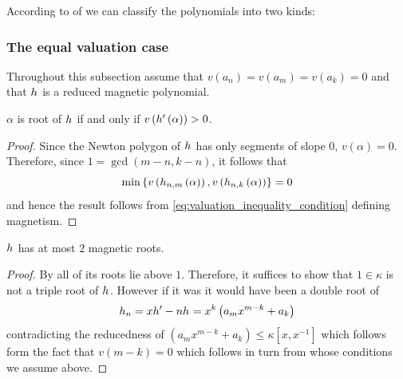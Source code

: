 \documentclass[../main.tex]{subfiles}
\begin{document}
  According to  of  we can classify the \redex polynomials into two kinds:

  \subsubsection{The equal valuation case}
  Throughout this subsection assume that $v\left( a_n \right) = v\left( a_m \right) = v\left( a_k \right) = 0$ and that $h_{}$ is a reduced magnetic polynomial.

  \begin{lemma}
    \label{lem:magnetism_away_from_ab}
    $\alpha$ is \anex root of $h_{}$ if and only if $v\left( h_{}'\left( \alpha \right) \right) > 0$.
  \end{lemma}
  \begin{proof}
    Since the Newton polygon of $h_{}$ has only segments of slope $0$, $v\left( \alpha \right) = 0$.
    Therefore, since $1 = \gcd\left( m - n, k - n \right)$, it follows that 
    \[
      \min\left\{  
        v\left( h_{n,m}\left( \alpha \right) \right),
        v\left( h_{n,k}\left( \alpha \right) \right)
      \right\} = 0
    \]
    and hence the result follows from \cref{eq:valuation_inequality_condition} defining magnetism.
  \end{proof}

  \begin{lemma}
    \label{lem:2_magnetic_roots}
    $h_{}$ has at most $2$ magnetic roots.
  \end{lemma}
  \begin{proof}
    By  all of its \ex roots lie above $1$.
    Therefore, it suffices to show that $1 \in \kappa$ is not a triple root of $h_{}$.
    However if it was it would have been a double root of 
    \[
      h_{n} 
      = 
      xh_{}' - nh_{} 
      =
      x^k \left( a_m x^{m - k} + a_k \right) 
    \] 
    contradicting the reducedness of $\left( a_m x^{m - k} + a_k \right) \leq \kappa\left[ x, x^{-1} \right]$ which follows form the fact that $v\left( m - k \right) = 0$ which follows in turn from  whose conditions we assume above.
  \end{proof}
\end{document}
